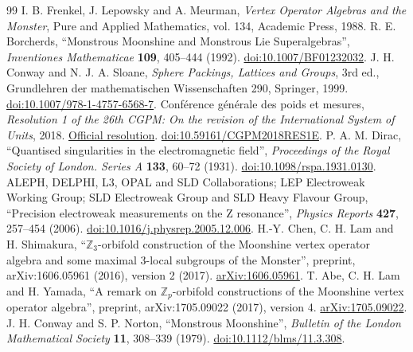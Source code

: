 \begin{thebibliography}{99}
 I. B. Frenkel, J. Lepowsky and A. Meurman, \emph{Vertex Operator Algebras and the Monster}, Pure and Applied Mathematics, vol. 134, Academic Press, 1988.
 R. E. Borcherds, ``Monstrous Moonshine and Monstrous Lie Superalgebras'', \emph{Inventiones Mathematicae} \textbf{109}, 405--444 (1992). \href{https://doi.org/10.1007/BF01232032}{doi:10.1007/BF01232032}.
 J. H. Conway and N. J. A. Sloane, \emph{Sphere Packings, Lattices and Groups}, 3rd ed., Grundlehren der mathematischen Wissenschaften 290, Springer, 1999. \href{https://doi.org/10.1007/978-1-4757-6568-7}{doi:10.1007/978-1-4757-6568-7}.
 Conférence générale des poids et mesures, \emph{Resolution 1 of the 26th CGPM: On the revision of the International System of Units}, 2018. \href{https://www.bipm.org/en/committees/cg/cgpm/26-2018/resolution-1}{Official resolution}. \href{https://doi.org/10.59161/CGPM2018RES1E}{doi:10.59161/CGPM2018RES1E}.
 P. A. M. Dirac, ``Quantised singularities in the electromagnetic field'', \emph{Proceedings of the Royal Society of London. Series A} \textbf{133}, 60--72 (1931). \href{https://doi.org/10.1098/rspa.1931.0130}{doi:10.1098/rspa.1931.0130}.
 ALEPH, DELPHI, L3, OPAL and SLD Collaborations; LEP Electroweak Working Group; SLD Electroweak Group and SLD Heavy Flavour Group, ``Precision electroweak measurements on the Z resonance'', \emph{Physics Reports} \textbf{427}, 257--454 (2006). \href{https://doi.org/10.1016/j.physrep.2005.12.006}{doi:10.1016/j.physrep.2005.12.006}.
 H.-Y. Chen, C. H. Lam and H. Shimakura, ``\(\mathbb Z_3\)-orbifold construction of the Moonshine vertex operator algebra and some maximal \(3\)-local subgroups of the Monster'', preprint, arXiv:1606.05961 (2016), version 2 (2017). \href{https://arxiv.org/abs/1606.05961}{arXiv:1606.05961}.
 T. Abe, C. H. Lam and H. Yamada, ``A remark on \(\mathbb Z_p\)-orbifold constructions of the Moonshine vertex operator algebra'', preprint, arXiv:1705.09022 (2017), version 4. \href{https://arxiv.org/abs/1705.09022v4}{arXiv:1705.09022}.
 J. H. Conway and S. P. Norton, ``Monstrous Moonshine'', \emph{Bulletin of the London Mathematical Society} \textbf{11}, 308--339 (1979). \href{https://doi.org/10.1112/blms/11.3.308}{doi:10.1112/blms/11.3.308}.
\end{thebibliography}
